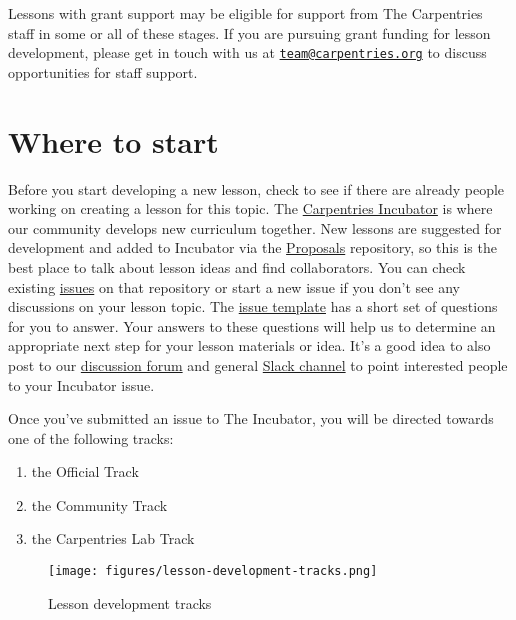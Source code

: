 \documentclass[
]{book}
\providecommand{\tightlist}{%
  \setlength{\itemsep}{0pt}\setlength{\parskip}{0pt}}
\begin{document}
Lessons with grant support may be eligible for
support from The Carpentries staff in some or all of
these stages. If you are pursuing grant funding for
lesson development, please get in touch with us at
\href{mailto:team@carpentries.org}{\nolinkurl{team@carpentries.org}} to discuss opportunities for staff
support.

\hypertarget{where-to-start}{%
\section{Where to start}\label{where-to-start}}

Before you start developing a new lesson, check
to see if there are already people working on creating
a lesson for this topic.
The \href{https://github.com/carpentries-incubator/}{Carpentries Incubator} is where our community
develops new curriculum together.
New lessons are suggested for development and added to Incubator via the \href{https://github.com/carpentries-incubator/proposals/blob/master/README.md}{Proposals} repository,
so this is the best place to talk about lesson ideas and find collaborators.
You can check existing \href{https://github.com/carpentries-incubator/proposals/issues}{issues} on that repository
or start a new issue if you don't see any discussions
on your lesson topic. The \href{https://github.com/carpentries-incubator/proposals/blob/master/ISSUE_TEMPLATE.md}{issue template} has
a short set of questions for you to answer. Your answers
to these questions will help us to determine an
appropriate next step for your lesson materials or
idea. It's a good idea to also post to our
\href{https://carpentries.topicbox.com/groups/discuss}{discussion forum} and general \href{https://swc-slack-invite.herokuapp.com/}{Slack channel} to point interested people to your
Incubator issue.

Once you've submitted an issue to The Incubator,
you will be directed towards one of the following
tracks:

\begin{enumerate}
\def\labelenumi{\arabic{enumi}.}
\tightlist
\item
  the Official Track
\item
  the Community Track
\item
  the Carpentries Lab Track
\end{enumerate}

\begin{figure}
\centering
\texttt{[image: figures/lesson-development-tracks.png]}
\caption{Lesson development tracks}
\end{figure}
\end{document}
